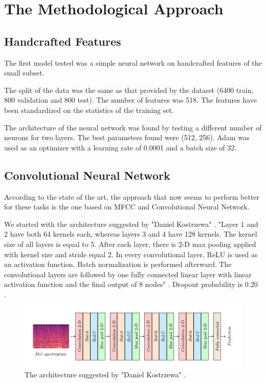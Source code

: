 \section{The Methodological Approach}


\subsection{Handcrafted Features}
The first model tested was a simple neural network on handcrafted features of the small subset.

The split of the data was the same as that provided by the dataset (6400 train, 800 validation and 800 test).
The number of features was 518. The features have been standardized on the statistics of the training set.

The architecture of the neural network was found by testing a different number of neurons for two layers. 
The best parameters found were (512, 256).
Adam was used as an optimizer with a learning rate of 0.0001 and a batch size of 32.

\subsection{Convolutional Neural Network}
According to the state of the art, the approach that now seems to perform better for these tasks is the one based on MFCC and Convolutional Neural Network. 

We started with the architecture suggested by "Daniel Kostrzewa" \cite{kostrzewa2021music}.
"Layer 1 and 2 have both 64 kernels each, whereas layers 3 and 4 have 128 kernels. The kernel size of all layers is equal to 5. After each layer, there is 2-D max pooling applied with kernel size and stride equal 2. In every convolutional layer, ReLU is used as an activation function. Batch normalization is performed afterward. The convolutional layers are followed by one fully connected linear layer with linear activation function and the final output of 8 nodes" \cite{kostrzewa2021music}. Dropout probability is 0.20 .

\begin{figure}[ht]
\centering
\includegraphics[scale=0.6]{images/CNN-architecture.png}
\caption{The architecture suggested by "Daniel Kostrzewa" \cite{kostrzewa2021music}.}
\label{fig:CNN-architecture}
\end{figure}

